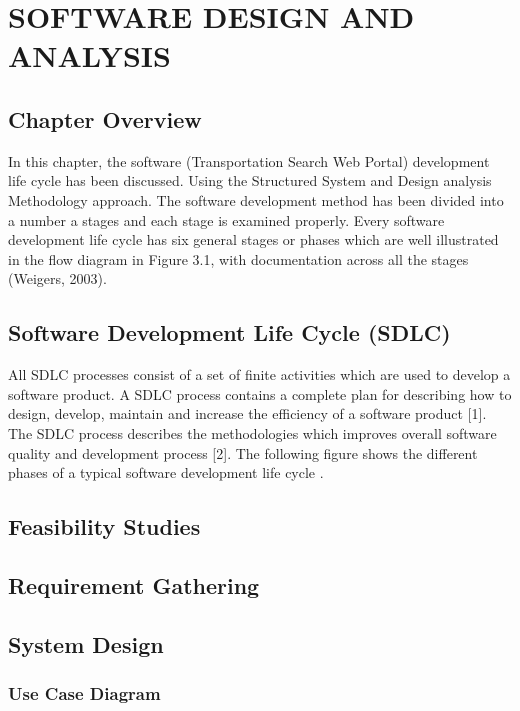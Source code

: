 \documentclass[oneside,12pt]{book}
\begin{document}
\chapter{SOFTWARE DESIGN AND ANALYSIS}

\section{Chapter Overview}
In this chapter, the software (Transportation Search Web Portal) development life cycle has been discussed. Using the Structured System and Design analysis Methodology approach. The software development method has been divided into a number a stages and each stage is examined properly. Every software development life cycle has six general stages or phases which are well illustrated in the flow diagram in Figure 3.1, with documentation across all the stages (Weigers, 2003).

\section{Software Development Life Cycle (SDLC)}

All SDLC processes consist of a set of finite activities which are used to develop a software product. A SDLC process contains a complete plan for describing how to design, develop, maintain and increase the efficiency of a software product [1]. The SDLC process describes the methodologies which improves overall software quality and development process [2]. The following figure shows the different phases  of a typical software development life cycle \citep{kazim_study_2017}.

\section{Feasibility Studies}


\section{Requirement Gathering}

\section{System Design}

\subsection{Use Case Diagram}
\end{document}
